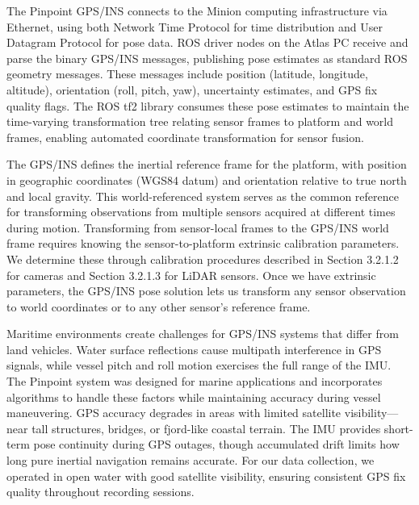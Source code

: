 \documentclass{erauthesis}
\begin{document}
The Pinpoint \ac{GPS}/\ac{INS} connects to the Minion computing infrastructure via Ethernet, using both Network Time Protocol for time distribution and User Datagram Protocol for pose data.
\ac{ROS} driver nodes on the Atlas PC receive and parse the binary \ac{GPS}/\ac{INS} messages, publishing pose estimates as standard \ac{ROS} geometry messages.
These messages include position (latitude, longitude, altitude), orientation (roll, pitch, yaw), uncertainty estimates, and \ac{GPS} fix quality flags.
The \ac{ROS} tf2 library consumes these pose estimates to maintain the time-varying transformation tree relating sensor frames to platform and world frames, enabling automated coordinate transformation for sensor fusion.

The \ac{GPS}/\ac{INS} defines the inertial reference frame for the platform, with position in geographic coordinates (WGS84 datum) and orientation relative to true north and local gravity.
This world-referenced system serves as the common reference for transforming observations from multiple sensors acquired at different times during motion.
Transforming from sensor-local frames to the \ac{GPS}/\ac{INS} world frame requires knowing the sensor-to-platform extrinsic calibration parameters.
We determine these through calibration procedures described in Section 3.2.1.2 for cameras and Section 3.2.1.3 for \ac{LiDAR} sensors.
Once we have extrinsic parameters, the \ac{GPS}/\ac{INS} pose solution lets us transform any sensor observation to world coordinates or to any other sensor's reference frame.

Maritime environments create challenges for \ac{GPS}/\ac{INS} systems that differ from land vehicles.
Water surface reflections cause multipath interference in \ac{GPS} signals, while vessel pitch and roll motion exercises the full range of the \ac{IMU}.
The Pinpoint system was designed for marine applications and incorporates algorithms to handle these factors while maintaining accuracy during vessel maneuvering.
\ac{GPS} accuracy degrades in areas with limited satellite visibility—near tall structures, bridges, or fjord-like coastal terrain.
The \ac{IMU} provides short-term pose continuity during \ac{GPS} outages, though accumulated drift limits how long pure inertial navigation remains accurate.
For our data collection, we operated in open water with good satellite visibility, ensuring consistent \ac{GPS} fix quality throughout recording sessions.
\end{document}

